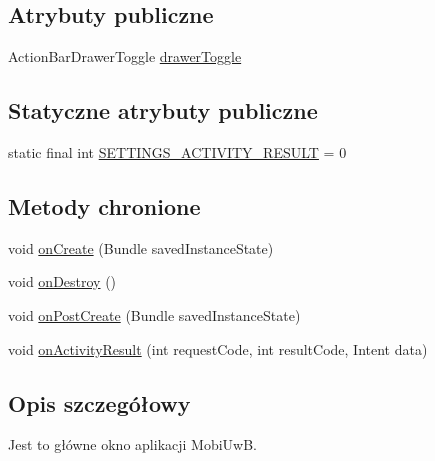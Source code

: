 \subsection*{Atrybuty publiczne}
\begin{DoxyCompactItemize}
\item 
Action\+Bar\+Drawer\+Toggle \hyperlink{classpl_1_1edu_1_1uwb_1_1mobiuwb_1_1view_1_1mainactivity_1_1_main_activity_adcd865523f4722f51418797af0fd9b7e}{drawer\+Toggle}
\end{DoxyCompactItemize}
\subsection*{Statyczne atrybuty publiczne}
\begin{DoxyCompactItemize}
\item 
static final int \hyperlink{classpl_1_1edu_1_1uwb_1_1mobiuwb_1_1view_1_1mainactivity_1_1_main_activity_a270c6f59eb4d28ac2dd4dec0e6264333}{S\+E\+T\+T\+I\+N\+G\+S\+\_\+\+A\+C\+T\+I\+V\+I\+T\+Y\+\_\+\+R\+E\+S\+U\+L\+T} = 0
\end{DoxyCompactItemize}
\subsection*{Metody chronione}
\begin{DoxyCompactItemize}
\item 
void \hyperlink{classpl_1_1edu_1_1uwb_1_1mobiuwb_1_1view_1_1mainactivity_1_1_main_activity_ab2e1f2b281c4acd4d4d0ae8321606c82}{on\+Create} (Bundle saved\+Instance\+State)
\item 
void \hyperlink{classpl_1_1edu_1_1uwb_1_1mobiuwb_1_1view_1_1mainactivity_1_1_main_activity_acabdd46cdef1c0dc51b652b38a873a65}{on\+Destroy} ()
\item 
void \hyperlink{classpl_1_1edu_1_1uwb_1_1mobiuwb_1_1view_1_1mainactivity_1_1_main_activity_a03da77f7df0a89cc0e16d094e3324fe1}{on\+Post\+Create} (Bundle saved\+Instance\+State)
\item 
void \hyperlink{classpl_1_1edu_1_1uwb_1_1mobiuwb_1_1view_1_1mainactivity_1_1_main_activity_a17956482e0defd95fbcb67a03ea6e090}{on\+Activity\+Result} (int request\+Code, int result\+Code, Intent data)
\end{DoxyCompactItemize}


\subsection{Opis szczegółowy}
Jest to główne okno aplikacji Mobi\+Uw\+B. 

